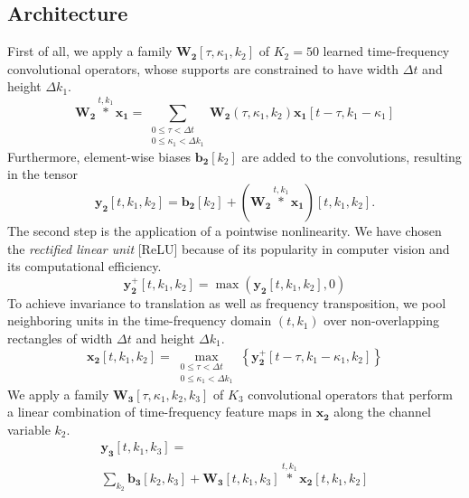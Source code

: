 \documentclass{article}
\begin{document}
\subsection{Architecture}
First of all, we apply a family $\boldsymbol{W_2}[\tau,\kappa_1,k_2]$ of $K_2=50$ learned time-frequency convolutional operators, whose supports are constrained to have width $\Delta t$ and height $\Delta k_1$. 
\begin{equation}
\boldsymbol{W_2}
\overset{t,k_1}{\ast}
\boldsymbol{x_1}
=
\! \!
\sum_{\substack{
0 \leq \tau < \Delta t \\
0 \leq \kappa_1 < \Delta k_1}}
\! \! \! \! \!
\boldsymbol{W_2}(\tau,\kappa_1,k_2)
\boldsymbol{x_1}[t-\tau,k_1-\kappa_1]
\end{equation}
Furthermore, element-wise biases $\boldsymbol{b_2}[k_2]$ are added to the convolutions, resulting in the tensor 
\begin{equation}
\boldsymbol{y_2}[t,k_1,k_2] =
\boldsymbol{b_2}[k_2] + 
(\boldsymbol{W_2}
\overset{t,k_1}{\ast}
\boldsymbol{x_1})[t,k_1,k_2].
\end{equation}
The second step is the application of a pointwise nonlinearity. We have chosen the \emph{rectified linear unit} [ReLU] because of its popularity in computer vision and its computational efficiency.
 \begin{equation}
 \boldsymbol{y_{2}^{+}}[t,k_1,k_2] = \max \left( \boldsymbol{y_2}[t,k_1,k_2], 0\right)
 \end{equation}
 To achieve invariance to translation as well as frequency transposition, we pool neighboring units in
 the time-frequency domain $(t, k_1)$ over non-overlapping rectangles of width $\Delta t$ and height $\Delta k_1$.
 \begin{equation}
 \boldsymbol{x_2}[t,k_1,k_2] = \! \!
 \max_{
\substack{
0 \leq \tau < \Delta t \\
0 \leq \kappa_1 < \Delta k_1}
 } \! \!
\left\{
 \boldsymbol{y_{2}^{+}}[t - \tau, k_1 - \kappa_1, k_2]
 \right\}
 \end{equation}
 We apply a family $\boldsymbol{W_3}[\tau, \kappa_1, k_2, k_3]$ of $K_3$ convolutional operators that perform a linear combination of time-frequency feature maps in $\boldsymbol{x_2}$ along the channel variable $k_2$.
 \begin{eqnarray}
 \boldsymbol{y_3}[t,k_1,k_3] =
 \qquad  \qquad  \qquad  \qquad  \qquad  \qquad  \qquad \nonumber
 \\
 \sum_{k_2}
 \boldsymbol{b_3}[k_2, k_3]
 + \boldsymbol{W_3}[t,k_1,k_3]
 \overset{t,k_1}{\ast}
 \boldsymbol{x_2}[t,k_1,k_2]
 \end{eqnarray}
\end{document}
